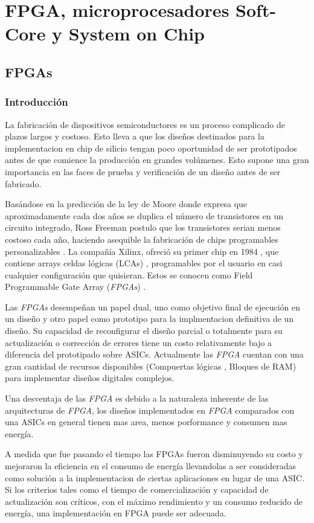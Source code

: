 
\chapter{FPGA, microprocesadores Soft-Core y System on Chip}
	

\section{FPGAs}

	\subsection{Introducción}
La fabricación de dispositivos semiconductores es un proceso complicado de plazos largos y costoso. Esto lleva a que los diseños destinados para la  implementacion en chip de silicio tengan poco oportunidad de ser prototipados antes de que comience la producción en grandes volúmenes. Esto supone una gran importancia  en las faces de prueba y verificación de un diseño antes de ser fabricado.

Basándose en la predicción de la ley de Moore donde expresa que aproximadamente cada dos años se duplica el número de transistores en un circuito integrado\cite{Etiqueta02}, Ross Freeman postulo que los transistores serian menos costoso cada año, haciendo asequible la fabricación de chips programables personalizables \cite{Etiqueta03}.
La compañía Xilinx, ofreció su primer chip en 1984 , que contiene arrays celdas lógicas (LCAs) , programables por el usuario en casi cualquier configuración que quisieran. Estos se conocen como Field Programmable Gate Array (\textit{FPGAs}) .

Las \textit{FPGAs} desempeñan un papel dual, uno como objetivo final de ejecución en un diseño y otro papel como prototipo para la implmentacion definitiva de un diseño. Su capacidad de reconfigurar el diseño parcial o totalmente para su actualización o corrección de errores tiene un costo relativamente bajo a diferencia del prototipado sobre ASICs.
Actualmente las \textit{FPGA} cuentan con una gran cantidad de recursos disponibles (Compuertas lógicas , Bloques de RAM) para implementar diseños digitales complejos.

Una desventaja de las \textit{FPGA}  es debido a la naturaleza inherente de las arquitecturas de \textit{FPGA}, los diseños implementados en \textit{FPGA} comparados con una ASICs en general tienen mas area, menos porformance y consumen mas energía.
		
A medida que fue pasando el tiempo las FPGAs fueron disminuyendo su costo y mejoraron la eficiencia en el consumo de energía llevandolas a ser consideradas como solución a la implementacion de ciertas aplicaciones en lugar de una ASIC. Si los criterios tales como el tiempo de comercialización y capacidad de actualización son críticos, con el máximo rendimiento y un consumo reducido de energía, una implementación en  FPGA puede ser adecuada.


